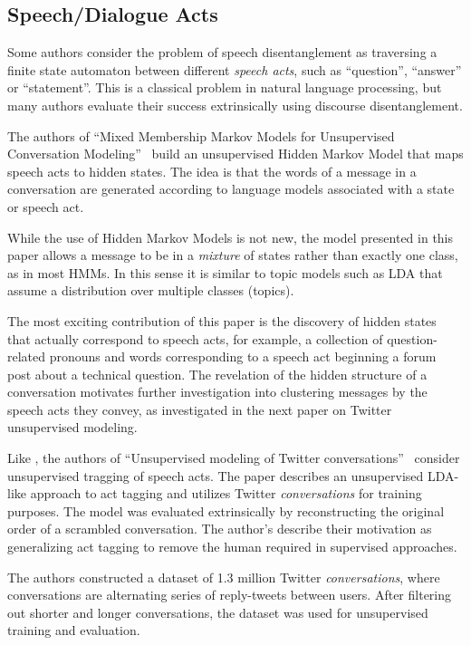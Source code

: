 \documentclass[11pt]{article}
\newcommand{\titlecite}[2]{``#1''~\cite{#2}}
\begin{document}
\subsection{Speech/Dialogue Acts}
Some authors consider the problem of speech disentanglement as traversing 
a finite state automaton between different \textit{speech acts}, such as
``question'', ``answer'' or ``statement''. This is a classical problem in
natural language processing, but many authors evaluate their success extrinsically 
using discourse disentanglement.

The authors of \titlecite{Mixed Membership Markov Models for Unsupervised
Conversation Modeling}{Paula} build an unsupervised Hidden Markov Model that 
maps speech acts to hidden states. The idea is that the words of a message in a conversation are generated 
according to language models associated
with a state or speech act. 

While the use of Hidden Markov Models is not new, the model presented in this
paper allows a message to be in a \emph{mixture} of states rather than exactly
one class, as in most HMMs. In this sense it is similar to topic models such as
LDA that assume a distribution over multiple classes (topics).

The most exciting contribution of this paper is the discovery of hidden states
that actually correspond to speech acts, for example, a collection of
question-related pronouns and words corresponding to a speech act beginning a
forum post about a technical question. The revelation of the hidden structure of
a conversation motivates further investigation into clustering messages by the
speech acts they convey, as investigated in the next paper on Twitter
unsupervised modeling.

Like \cite{Paula}, the authors of \titlecite{Unsupervised modeling of Twitter
conversations}{Ritter2010a} consider unsupervised tragging of speech acts.
The paper describes an unsupervised LDA-like approach to act tagging 
and utilizes Twitter \textit{conversations} for
training purposes. The model was evaluated extrinsically by reconstructing 
the original order of a scrambled conversation. The author's describe their motivation as
generalizing act tagging to remove the human required in supervised approaches. 

The authors constructed a dataset of 1.3 million Twitter \textit{conversations}, 
where conversations are alternating series of reply-tweets between users. After filtering out shorter 
and longer conversations, the dataset was used for unsupervised training and evaluation.
\end{document}
